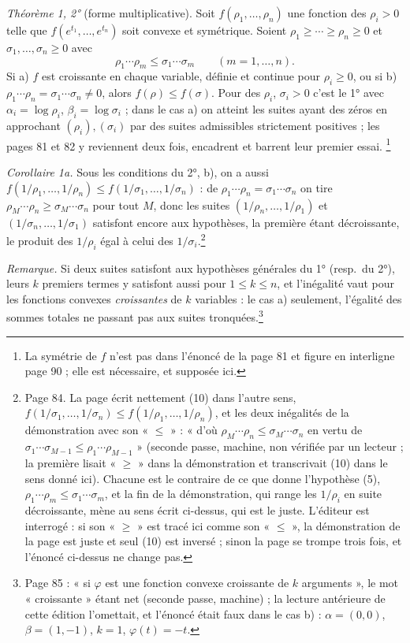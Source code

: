 \documentclass[11pt,a4paper]{article}
\begin{document}
\emph{Théorème 1, 2°} (forme multiplicative). Soit $f(\rho_1, \ldots,
\rho_n)$ une fonction des $\rho_i > 0$ telle que $f(e^{t_1}, \ldots, e^{t_n})$
soit convexe et symétrique. Soient $\rho_1 \geq \cdots \geq \rho_n \geq 0$ et
$\sigma_1, \ldots, \sigma_n \geq 0$ avec
\[
  \rho_1 \cdots \rho_m \leq \sigma_1 \cdots \sigma_m \qquad (m = 1, \ldots, n) .
\]
Si a) $f$ est croissante en chaque variable, définie et continue pour
$\rho_i \geq 0$, ou si b) $\rho_1 \cdots \rho_n = \sigma_1 \cdots \sigma_n
\neq 0$, alors $f(\rho) \leq f(\sigma)$. Pour des $\rho_i$, $\sigma_i > 0$
c'est le 1° avec $\alpha_i = \log\rho_i$, $\beta_i = \log\sigma_i$ ; dans le
cas a) on atteint les suites ayant des zéros en approchant $(\rho_i),
(\sigma_i)$ par des suites admissibles strictement positives ; les pages 81
et 82 y reviennent deux fois, encadrent et barrent leur premier essai.
\footnote{La symétrie de $f$ n'est pas dans l'énoncé de la page 81 et
figure en interligne page 90 ; elle est nécessaire, et supposée ici.}

\emph{Corollaire 1a.} Sous les conditions du 2°, b), on a aussi
$f(1/\rho_1, \ldots, 1/\rho_n) \leq f(1/\sigma_1, \ldots, 1/\sigma_n)$ : de
$\rho_1 \cdots \rho_n = \sigma_1 \cdots \sigma_n$ on tire $\rho_M \cdots
\rho_n \geq \sigma_M \cdots \sigma_n$ pour tout $M$, donc les suites
$(1/\rho_n, \ldots, 1/\rho_1)$ et $(1/\sigma_n, \ldots, 1/\sigma_1)$
satisfont encore aux hypothèses, la première étant décroissante, le
produit des $1/\rho_i$ égal à celui des $1/\sigma_i$.\footnote{Page 84. La
page écrit nettement (10) dans l'autre sens, $f(1/\sigma_1, \ldots,
1/\sigma_n) \leq f(1/\rho_1, \ldots, 1/\rho_n)$, et les deux inégalités de la
démonstration avec son « $\leq$ » : « d'où $\rho_M \cdots \rho_n \leq \sigma_M
\cdots \sigma_n$ en vertu de $\sigma_1 \cdots \sigma_{M-1} \leq \rho_1 \cdots
\rho_{M-1}$ » (seconde passe, machine, non vérifiée par un lecteur ; la
première lisait « $\geq$ » dans la démonstration et transcrivait (10) dans
le sens donné ici). Chacune est le contraire de ce que donne l'hypothèse
(5), $\rho_1 \cdots \rho_m \leq \sigma_1 \cdots \sigma_m$, et la fin de la
démonstration, qui range les $1/\rho_i$ en suite décroissante, mène au sens
écrit ci-dessus, qui est le juste. L'éditeur est interrogé : si son
« $\geq$ » est tracé ici comme son « $\leq$ », la démonstration de la page
est juste et seul (10) est inversé ; sinon la page se trompe trois fois, et
l'énoncé ci-dessus ne change pas.}

\emph{Remarque.} Si deux suites satisfont aux hypothèses générales du 1°
(resp.\ du 2°), leurs $k$ premiers termes y satisfont aussi pour $1 \leq k
\leq n$, et l'inégalité vaut pour les fonctions convexes \emph{croissantes}
de $k$ variables : le cas a) seulement, l'égalité des sommes totales ne
passant pas aux suites tronquées.\footnote{Page 85 : « si $\varphi$ est une
fonction convexe croissante de $k$ arguments », le mot « croissante » étant
net (seconde passe, machine) ; la lecture antérieure de cette édition
l'omettait, et l'énoncé était faux dans le cas b) : $\alpha = (0,0)$, $\beta
= (1,-1)$, $k = 1$, $\varphi(t) = -t$.}
\end{document}
